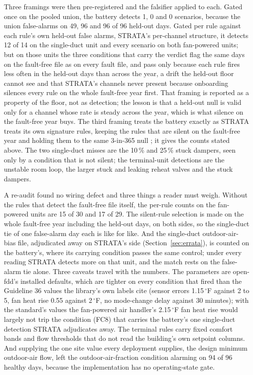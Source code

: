 \documentclass[11pt,letterpaper]{article}
\begin{document}
Three framings were then pre-registered and the falsifier applied to each. Gated once on the pooled union, the battery detects 1, 0 and 0 scenarios, because the union false-alarms on 49, 96 and 96 of 96 held-out days. Gated per rule against each rule's own held-out false alarms, STRATA's per-channel structure, it detects 12 of 14 on the single-duct unit and every scenario on both fan-powered units; but on those units the three conditions that carry the verdict flag the same days on the fault-free file as on every fault file, and pass only because each rule fires less often in the held-out days than across the year, a drift the held-out floor cannot see and that STRATA's channels never present because onboarding silences every rule on the whole fault-free year first. That framing is reported as a property of the floor, not as detection; the lesson is that a held-out null is valid only for a channel whose rate is steady across the year, which is what silence on the fault-free year buys. The third framing treats the battery exactly as STRATA treats its own signature rules, keeping the rules that are silent on the fault-free year and holding them to the same 3-in-365 null \cite{hanley1983zeronumerators}; it gives the counts stated above. The two single-duct misses are the 10\,\% and 25\,\% stuck dampers, seen only by a condition that is not silent; the terminal-unit detections are the unstable room loop, the larger stuck and leaking reheat valves and the stuck dampers.

A re-audit found no wiring defect and three things a reader must weigh. Without the rules that detect the fault-free file itself, the per-rule counts on the fan-powered units are 15 of 30 and 17 of 29. The silent-rule selection is made on the whole fault-free year including the held-out days, on both sides, so the single-duct tie of one false-alarm day each is like for like. And the single-duct outdoor-air-bias file, adjudicated away on STRATA's side (Section~\ref{sec:errata}), is counted on the battery's, where its carrying condition passes the same control; under every reading STRATA detects more on that unit, and the match rests on the false-alarm tie alone. Three caveats travel with the numbers. The parameters are open-fdd's installed defaults, which are tighter on every condition that fired than the Guideline 36 values the library's own labels cite (sensor errors 1.15\,$^\circ$F against 2 to 5, fan heat rise 0.55 against 2\,$^\circ$F, no mode-change delay against 30 minutes); with the standard's values the fan-powered air handler's 2.15\,$^\circ$F fan heat rise would largely not trip the condition (FC8) that carries the battery's one single-duct detection STRATA adjudicates away. The terminal rules carry fixed comfort bands and flow thresholds that do not read the building's own setpoint columns. And supplying the one site value every deployment supplies, the design minimum outdoor-air flow, left the outdoor-air-fraction condition alarming on 94 of 96 healthy days, because the implementation has no operating-state gate.
\end{document}
